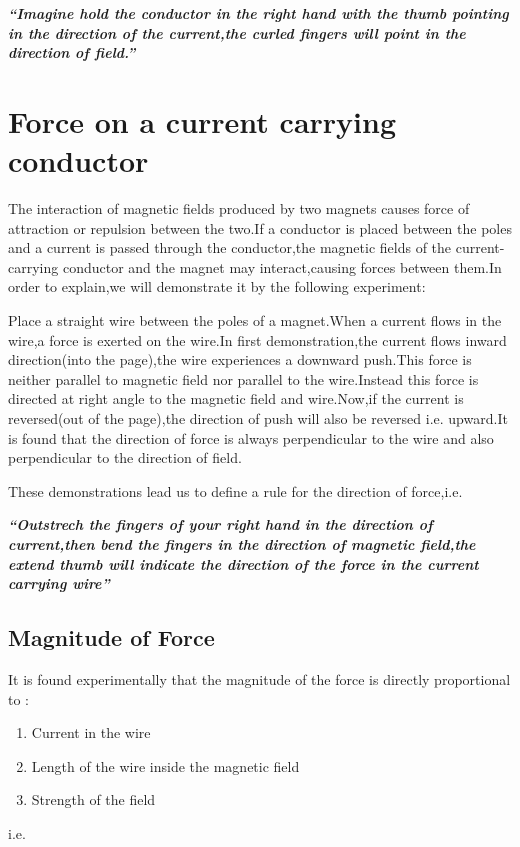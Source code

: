 \textit{\textbf{“Imagine hold the conductor in the right hand with the thumb pointing in the direction of the current,the curled fingers will point in the direction of field.”}}

\section{Force on a current carrying conductor}
The interaction of magnetic fields produced by two magnets causes force of attraction or repulsion between the two.If a conductor is placed between the poles and a current is passed through the conductor,the magnetic fields of the current-carrying conductor and the magnet may interact,causing forces between them.In order to explain,we will demonstrate it by the following experiment:

Place a straight wire between the poles of a magnet.When a current flows in the wire,a force is exerted on the wire.In first demonstration,the current flows inward direction(into the page),the wire experiences a downward push.This force is neither parallel to magnetic field nor parallel to the wire.Instead this force is directed at right angle to the magnetic field and wire.Now,if the current is reversed(out of the page),the direction of push will also be reversed i.e. upward.It is found that the direction of force is always perpendicular to the wire and also perpendicular to the direction of field.





These demonstrations lead us to define a rule for the direction of force,i.e.

\textit{\textbf{“Outstrech the fingers of your right hand in the direction of current,then bend the fingers in the direction of magnetic field,the extend thumb will indicate the direction of the force in the current carrying wire”}}


\subsection{Magnitude of Force}
 It is found experimentally that the magnitude of the force is directly proportional to :
 
 \begin{enumerate}[label = (\roman*)]
    \item Current in the wire
    \item Length of the wire inside the magnetic field
    \item Strength of the field
\end{enumerate}
i.e.


